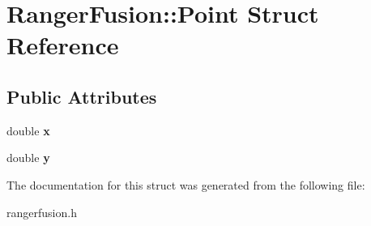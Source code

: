 \hypertarget{structRangerFusion_1_1Point}{}\section{Ranger\+Fusion\+:\+:Point Struct Reference}
\label{structRangerFusion_1_1Point}
\subsection*{Public Attributes}
\begin{DoxyCompactItemize}
\item 
double {\bfseries x}\hypertarget{structRangerFusion_1_1Point_aad4a1484b0897795f2cf1c425054439a}{}\label{structRangerFusion_1_1Point_aad4a1484b0897795f2cf1c425054439a}

\item 
double {\bfseries y}\hypertarget{structRangerFusion_1_1Point_a7684058bf1b973f45620ab211bf1c4eb}{}\label{structRangerFusion_1_1Point_a7684058bf1b973f45620ab211bf1c4eb}

\end{DoxyCompactItemize}


The documentation for this struct was generated from the following file\+:\begin{DoxyCompactItemize}
\item 
rangerfusion.\+h\end{DoxyCompactItemize}
